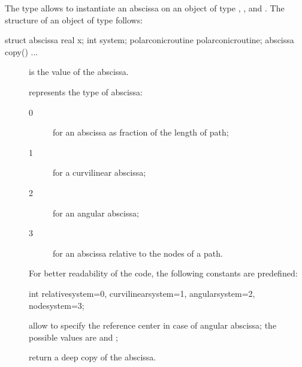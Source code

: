 \documentclass[pdftex]{article}
\begin{document}
The type  allows to instantiate an abscissa on an object
of type , ,  and . The
structure of an object of type  follows:
\begin{center}
  \begin{Vcolor}
    struct abscissa {
      real x; int system; polarconicroutine
      polarconicroutine;
      abscissa copy() {...}
    }
  \end{Vcolor}
\end{center}
\begin{description}
\item[] is the value of the abscissa.
\item[] represents the type of abscissa:
  \begin{description}
  \item[0] for an abscissa as fraction of the length of path;
  \item[1] for a curvilinear abscissa;
  \item[2] for an angular abscissa;
  \item[3] for an abscissa relative to the nodes of a path.
  \end{description}
  For better readability of the code, the following constants are
  predefined:
  
  \begin{Vcolor}
    int relativesystem=0, curvilinearsystem=1, angularsystem=2, nodesystem=3;
  \end{Vcolor}
  
\item[] allow to specify the reference
  center in case of angular abscissa; the possible values are
   and ;
\item[] return a deep copy of the abscissa.
\end{description}
\end{document}
